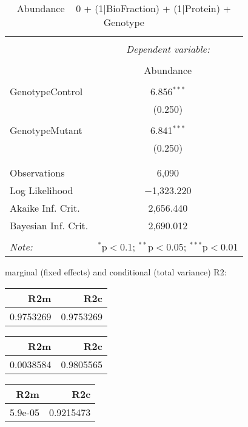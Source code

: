 \documentclass[11pt]{report}
\begin{document}
\begin{table}[!htbp] \centering 
  \caption{Abundance ~ 0 + (1|BioFraction) + (1|Protein) + Genotype} 
  \label{} 
\begin{tabular}{@{\extracolsep{5pt}}lc} 
\\[-1.8ex]\hline 
\hline \\[-1.8ex] 
 & \multicolumn{1}{c}{\textit{Dependent variable:}} \\ 
\cline{2-2} 
\\[-1.8ex] & Abundance \\ 
\hline \\[-1.8ex] 
 GenotypeControl & 6.856$^{***}$ \\ 
  & (0.250) \\ 
  & \\ 
 GenotypeMutant & 6.841$^{***}$ \\ 
  & (0.250) \\ 
  & \\ 
\hline \\[-1.8ex] 
Observations & 6,090 \\ 
Log Likelihood & $-$1,323.220 \\ 
Akaike Inf. Crit. & 2,656.440 \\ 
Bayesian Inf. Crit. & 2,690.012 \\ 
\hline 
\hline \\[-1.8ex] 
\textit{Note:}  & \multicolumn{1}{r}{$^{*}$p$<$0.1; $^{**}$p$<$0.05; $^{***}$p$<$0.01} \\ 
\end{tabular} 
\end{table} 
marginal (fixed effects) and conditional (total variance) R2:

\begin{tabular}{r|r}
\hline
R2m & R2c\\
\hline
0.9753269 & 0.9753269\\
\hline
\end{tabular}

\begin{tabular}{r|r}
\hline
R2m & R2c\\
\hline
0.0038584 & 0.9805565\\
\hline
\end{tabular}

\begin{tabular}{r|r}
\hline
R2m & R2c\\
\hline
5.9e-05 & 0.9215473\\
\hline
\end{tabular}
\end{document}
